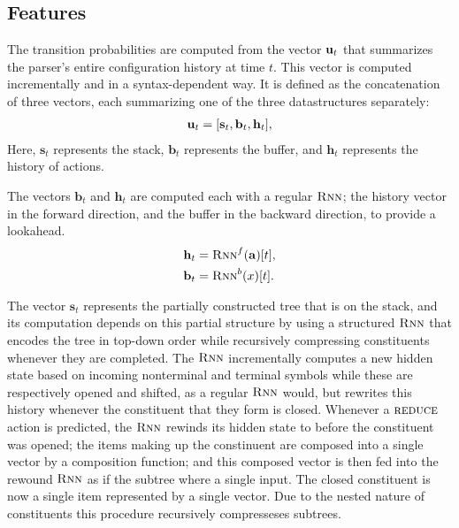 \subsection{Features}
The transition probabilities are computed from the vector $\mathbf{u}_t$ that summarizes the parser's entire configuration history at time $t$. This vector is computed incrementally and in a syntax-dependent way. It is defined as the concatenation of three vectors, each summarizing one of the three datastructures separately:
\begin{align*}
  \mathbf{u}_t = [\mathbf{s}_t, \mathbf{b}_t, \mathbf{h}_t],
\end{align*}
Here, $\mathbf{s}_t$ represents the stack, $\mathbf{b}_t$ represents the buffer, and $\mathbf{h}_t$ represents the history of actions.

The vectors $\mathbf{b}_t$ and $\mathbf{h}_t$ are computed each with a regular $\textsc{Rnn}$; the history vector in the forward direction, and the buffer in the backward direction, to provide a lookahead.
\begin{align*}
  \mathbf{h}_t &= \textsc{Rnn}^{f}( \mathbf{a} )[t],  \\
  \mathbf{b}_t &= \textsc{Rnn}^{b}( x )[t].  \\
\end{align*}

The vector $\mathbf{s}_t$ represents the partially constructed tree that is on the stack, and its computation depends on this partial structure by using a structured $\textsc{Rnn}$ that encodes the tree in top-down order while recursively compressing constituents whenever they are completed. The $\textsc{Rnn}$ incrementally computes a new hidden state based on incoming nonterminal and terminal symbols while these are respectively opened and shifted, as a regular $\textsc{Rnn}$ would, but rewrites this history whenever the constituent that they form is closed. Whenever a $\textsc{reduce}$ action is predicted, the $\textsc{Rnn}$ rewinds its hidden state to before the constituent was opened; the items making up the constinuent are composed into a single vector by a composition function; and this composed vector is then fed into the rewound $\textsc{Rnn}$ as if the subtree where a single input. The closed constituent is now a single item represented by a single vector. Due to the nested nature of constituents this procedure recursively compresseses subtrees.

